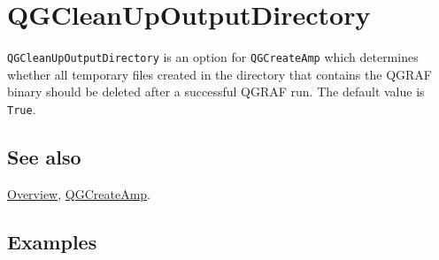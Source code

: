 \documentclass[../FeynHelpersManual.tex]{subfiles}
\begin{document}
\hypertarget{qgcleanupoutputdirectory}{
\section{QGCleanUpOutputDirectory}\label{qgcleanupoutputdirectory}}

\texttt{QGCleanUpOutputDirectory} is an option for \texttt{QGCreateAmp}
which determines whether all temporary files created in the directory
that contains the QGRAF binary should be deleted after a successful
QGRAF run. The default value is \texttt{True}.

\subsection{See also}

\hyperlink{toc}{Overview}, \hyperlink{qgcreateamp}{QGCreateAmp}.

\subsection{Examples}
\end{document}
